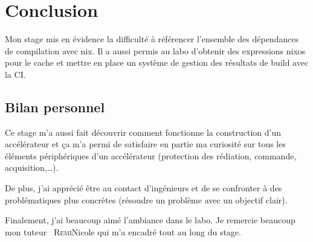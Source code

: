 \documentclass[a4paper,12pt]{article}
\newcommand\nom[2][]{#1~\textsc{#2}}
\begin{document}
\section{Conclusion}

Mon stage mis en évidence la difficulté à référencer l'ensemble des dépendances
de compilation avec nix. Il a aussi permis au labo d'obtenir des expressions
nixos pour le cache et mettre en place un système de gestion des résultats de
build avec la CI.\@

\subsection*{Bilan personnel}

Ce stage m'a aussi fait découvrir comment fonctionne la construction d'un
accélérateur et ça m'a permi de satisfaire en partie ma curiosité sur tous les
éléments périphériques d'un accélérateur (protection des rédiation, commande,
acquisition,\dots).

De plus, j'ai apprécié être au contact d'ingénieurs et de se confronter à des
problématiques plus concrètes (résoudre un problème avec un objectif clair).

Finalement, j'ai beaucoup aimé l'ambiance dans le labo. Je remercie beaucoup mon
tuteur \nom{Remi}{Nicole} qui m'a encadré tout au long du stage.

\printbibliography{}
\end{document}
